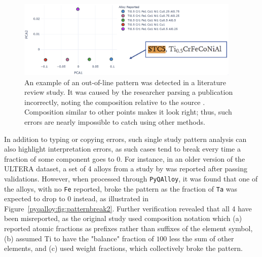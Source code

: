 \begin{figure}[H]
    \centering
    \includegraphics[width=0.95\textwidth]{pyqalloy/pyqalloy_HumanError.png}
    \caption{An example of an out-of-line pattern was detected in a literature review study. It was caused by the researcher parsing a publication incorrectly, noting the composition relative to the source \cite{Wang2009AtomicAlloy}. Composition similar to other points makes it look right; thus, such errors are nearly impossible to catch using other methods.}
    \label{pyqalloy:fig:patternbreak1}
\end{figure}


In addition to typing or copying errors, such single study pattern analysis can also highlight interpretation errors, as such cases tend to break every time a fraction of some component goes to $0$. For instance, in an older version of the ULTERA dataset, a set of 4 alloys from a study by \citet{Amigo2019MechanicalApplications} was reported after passing validations. However, when processed through \texttt{PyQAlloy}, it was found that one of the alloys, with no \texttt{Fe} reported, broke the pattern as the fraction of \texttt{Ta} was expected to drop to $0$ instead, as illustrated in Figure~\ref{pyqalloy:fig:patternbreak2}. Further verification revealed that all 4 have been misreported, as the original study used composition notation which (a) reported atomic fractions as prefixes rather than suffixes of the element symbol, (b) assumed Ti to have the "balance" fraction of $100$ less the sum of other elements, and (c) used weight fractions, which collectively broke the pattern.


